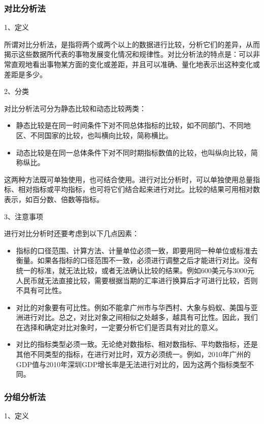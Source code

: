 \subsubsection{对比分析法}

1、定义

所谓对比分析法，是指将两个或两个以上的数据进行比较，分析它们的差异，从而揭示这些数据所代表的事物发展变化情况和规律性。对比分析法的特点是：可以非常直观地看出事物某方面的变化或差距，并且可以准确、量化地表示出这种变化或差距是多少。

2、分类

对比分析法可分为静态比较和动态比较两类：
\begin{itemize}
	\item 静态比较是在同一时间条件下对不同总体指标的比较，如不同部门、不同地区、不同国家的比较，也叫横向比较，简称横比。
    \item 动态比较是在同一总体条件下对不同时期指标数值的比较，也叫纵向比较，简称纵比。
\end{itemize}

这两种方法既可单独使用，也可结合使用。进行对比分析时，可以单独使用总量指标、相对指标或平均指标，也可将它们结合起来进行对比。比较的结果可用相对数表示，如百分数、倍数等指标。

3、注意事项

进行对比分析时还要考虑到以下几点因素：
\begin{itemize}
    \item 指标的口径范围、计算方法、计量单位必须一致，即要用同一种单位或标准去衡量。如果各指标的口径范围不一致，必须进行调整之后才能进行对比。没有统一的标准，就无法比较，或者无法确认比较的结果。例如600美元与3000元人民币就无法直接比较，需要根据当期的汇率进行换算后才可进行比较，否则不具有可比性。
    \item 对比的对象要有可比性。例如不能拿广州市与华西村、大象与蚂蚁、美国与亚洲进行对比。总之，对比对象之间相似之处越多，越具有可比性。因此，我们在选择和确定对比对象时，一定要分析它们是否具有对比的意义。
    \item 对比的指标类型必须一致。无论绝对数指标、相对数指标、平均数指标，还是其他不同类型的指标，在进行对比时，双方必须统一。例如，2010年广州的GDP值与2010年深圳GDP增长率是无法进行对比的，因为这两个指标类型不同。
\end{itemize}

\subsubsection{分组分析法}

1、定义

